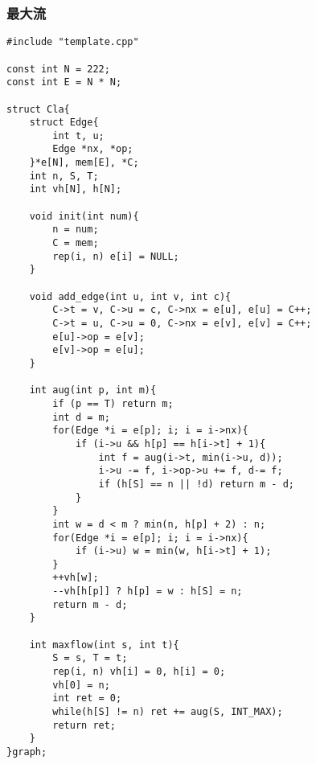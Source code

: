 \subsubsection{最大流}
\begin{verbatim}
#include "template.cpp" 

const int N = 222;
const int E = N * N;

struct Cla{
    struct Edge{
        int t, u;
        Edge *nx, *op;
    }*e[N], mem[E], *C;
    int n, S, T;
    int vh[N], h[N];

    void init(int num){
        n = num;
        C = mem;
        rep(i, n) e[i] = NULL;
    }

    void add_edge(int u, int v, int c){
        C->t = v, C->u = c, C->nx = e[u], e[u] = C++;
        C->t = u, C->u = 0, C->nx = e[v], e[v] = C++;
        e[u]->op = e[v];
        e[v]->op = e[u];
    }

    int aug(int p, int m){
        if (p == T) return m;
        int d = m;
        for(Edge *i = e[p]; i; i = i->nx){
            if (i->u && h[p] == h[i->t] + 1){
                int f = aug(i->t, min(i->u, d));
                i->u -= f, i->op->u += f, d-= f;
                if (h[S] == n || !d) return m - d;
            }
        }
        int w = d < m ? min(n, h[p] + 2) : n;
        for(Edge *i = e[p]; i; i = i->nx){
            if (i->u) w = min(w, h[i->t] + 1);
        }
        ++vh[w];
        --vh[h[p]] ? h[p] = w : h[S] = n;
        return m - d;
    }

    int maxflow(int s, int t){
        S = s, T = t;
        rep(i, n) vh[i] = 0, h[i] = 0;
        vh[0] = n;
        int ret = 0;
        while(h[S] != n) ret += aug(S, INT_MAX);
        return ret;
    }
}graph;
\end{verbatim}
